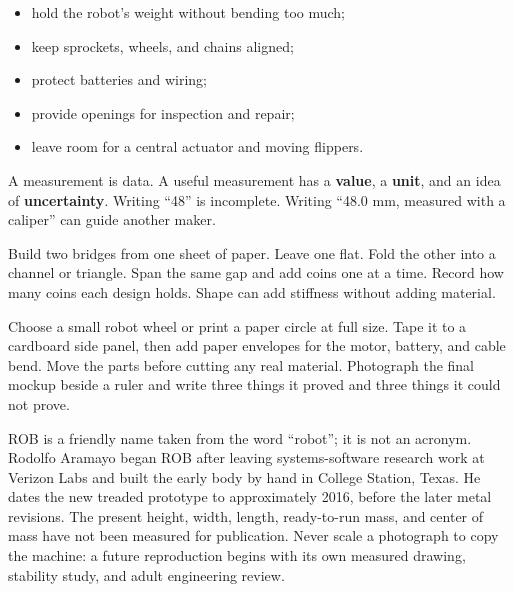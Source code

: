 \documentclass[11pt,openany]{book}
\begin{document}
\begin{itemize}
  \item hold the robot's weight without bending too much;
  \item keep sprockets, wheels, and chains aligned;
  \item protect batteries and wiring;
  \item provide openings for inspection and repair;
  \item leave room for a central actuator and moving flippers.
\end{itemize}


\begin{conceptbox}
A measurement is data. A useful measurement has a \textbf{value}, a \textbf{unit}, and an idea of \textbf{uncertainty}. Writing ``48'' is incomplete. Writing ``48.0 mm, measured with a caliper'' can guide another maker.
\end{conceptbox}

\begin{buildbox}[title={PAPER CHASSIS TEST}]
Build two bridges from one sheet of paper. Leave one flat. Fold the other into a channel or triangle. Span the same gap and add coins one at a time. Record how many coins each design holds. Shape can add stiffness without adding material.
\end{buildbox}

\begin{buildbox}[title={MAKE A FULL-SIZE INTERFACE MOCKUP}]
Choose a small robot wheel or print a paper circle at full size. Tape it to a cardboard side panel, then add paper envelopes for the motor, battery, and cable bend. Move the parts before cutting any real material. Photograph the final mockup beside a ruler and write three things it proved and three things it could not prove.
\end{buildbox}

\begin{fieldnotebox}[title={ROB IS A NAME, NOT A DIMENSION SET}]
ROB is a friendly name taken from the word ``robot''; it is not an acronym. Rodolfo Aramayo began ROB after leaving systems-software research work at Verizon Labs and built the early body by hand in College Station, Texas. He dates the new treaded prototype to approximately 2016, before the later metal revisions. The present height, width, length, ready-to-run mass, and center of mass have not been measured for publication. Never scale a photograph to copy the machine: a future reproduction begins with its own measured drawing, stability study, and adult engineering review.
\end{fieldnotebox}
\end{document}
